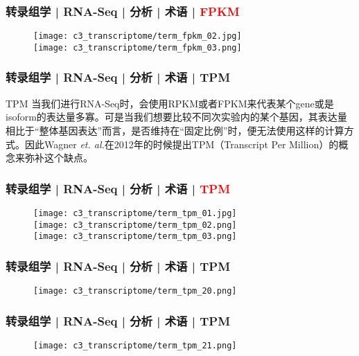 \begin{frame}
  \frametitle{转录组学 | RNA-Seq | 分析 | 术语 | \textcolor{red}{FPKM}}
  \begin{figure}
    \centering
    \texttt{[image: c3\_transcriptome/term\_fpkm\_02.jpg]}\\
    \vspace{1em}
    \texttt{[image: c3\_transcriptome/term\_fpkm\_03.png]}
  \end{figure}
\end{frame}

\begin{frame}
  \frametitle{转录组学 | RNA-Seq | 分析 | 术语 | TPM}
  \begin{block}{TPM}
    当我们进行RNA-Seq时，会使用RPKM或者FPKM来代表某个gene或是isoform的表达量多寡。可是当我们想要比较不同次实验内的某个基因，其表达量相比于“整体基因表达”而言，是否维持在“固定比例”时，便无法使用这样的计算方式。因此Wagner \textit{et. al.}在2012年的时候提出TPM（Transcript Per Million）的概念来弥补这个缺点。
  \end{block}
\end{frame}

\begin{frame}
  \frametitle{转录组学 | RNA-Seq | 分析 | 术语 | \textcolor{red}{TPM}}
  \begin{figure}
    \centering
    \texttt{[image: c3\_transcriptome/term\_tpm\_01.jpg]}\\
    \texttt{[image: c3\_transcriptome/term\_tpm\_02.png]}\\
    \texttt{[image: c3\_transcriptome/term\_tpm\_03.png]}
  \end{figure}
\end{frame}

\begin{frame}
  \frametitle{转录组学 | RNA-Seq | 分析 | 术语 | TPM}
  \begin{figure}
    \centering
    \texttt{[image: c3\_transcriptome/term\_tpm\_20.png]}
  \end{figure}
\end{frame}

\begin{frame}
  \frametitle{转录组学 | RNA-Seq | 分析 | 术语 | TPM}
  \begin{figure}
    \centering
    \texttt{[image: c3\_transcriptome/term\_tpm\_21.png]}
  \end{figure}
\end{frame}

